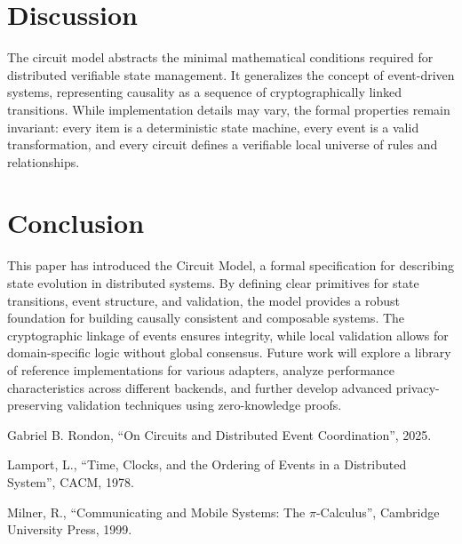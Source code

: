 \documentclass{article}
\begin{document}
\section{Discussion}

The circuit model abstracts the minimal mathematical conditions required for distributed verifiable state management. It generalizes the concept of event-driven systems, representing causality as a sequence of cryptographically linked transitions. While implementation details may vary, the formal properties remain invariant: every item is a deterministic state machine, every event is a valid transformation, and every circuit defines a verifiable local universe of rules and relationships.

\section{Conclusion}

This paper has introduced the Circuit Model, a formal specification for describing state evolution in distributed systems. By defining clear primitives for state transitions, event structure, and validation, the model provides a robust foundation for building causally consistent and composable systems. The cryptographic linkage of events ensures integrity, while local validation allows for domain-specific logic without global consensus. Future work will explore a library of reference implementations for various adapters, analyze performance characteristics across different backends, and further develop advanced privacy-preserving validation techniques using zero-knowledge proofs.

\begin{thebibliography}{9}

Gabriel B. Rondon, “On Circuits and Distributed Event Coordination”, 2025.

Lamport, L., “Time, Clocks, and the Ordering of Events in a Distributed System”, CACM, 1978.

Milner, R., “Communicating and Mobile Systems: The $\pi$-Calculus”, Cambridge University Press, 1999.

\end{thebibliography}
\end{document}
